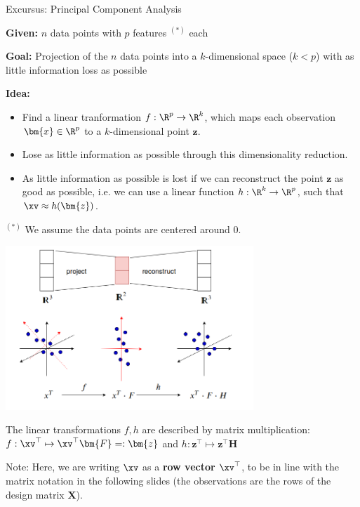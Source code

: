 \documentclass[11pt,compress,t,notes=noshow, xcolor=table]{beamer}
\begin{document}
\begin{vbframe}{Excursus: Principal Component Analysis}

\textbf{Given: } $n$ data points with $p$ features $^{(*)}$ each

\lz

\textbf{Goal: } Projection of the $n$ data points into a $k$-dimensional space ($k < p$) with as little information loss as possible

\lz

\textbf{Idea: }

\begin{itemize}
\item Find a linear tranformation $f: \R^p \to \R^k$, which maps each observation $\bm{x}\in \R^p$ to a $k$-dimensional point $\bm{z}$.
\item Lose as little information as possible through this dimensionality reduction.
\item As little information as possible is lost if we can reconstruct the point $\bm{z}$ as good as possible, i.e. we can use a linear function $h: \R^k \to \R^p$, such that $\xv \approx h(\bm{z})$.
\end{itemize}

\vfill

$^{(*)}$ We assume the data points are centered around $0$.

\framebreak

\begin{center}
  \includegraphics[width = 0.7\textwidth]{figure_man/matrixapproxi_s18.png}
\end{center}


The linear transformations $f, h$ are described by matrix multiplication: $f: \xv^\top \mapsto \xv^\top \bm{F} =: \bm{z}$ and $h: \bm{z}^\top \mapsto \bm{z}^\top \bm{H}$

\begin{footnotesize}
	Note: Here, we are writing $\xv$ as a \textbf{row vector} $\xv^\top$, to be in line with the matrix notation in the following slides (the observations are the rows of the design matrix $\bm{X}$).
\end{footnotesize}


\end{vbframe}
\end{document}
